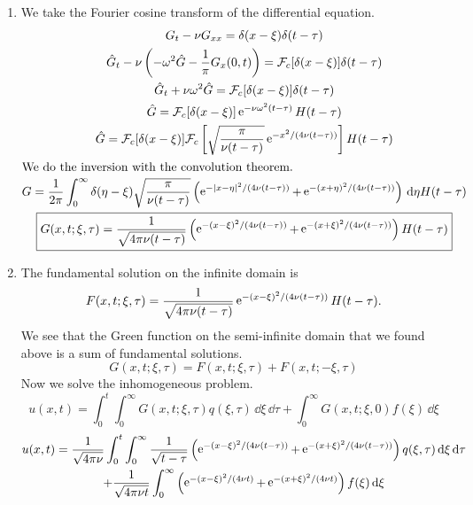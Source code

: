 {\begin{Solution}
  \begin{enumerate}
  \item
    We take the Fourier cosine transform of the differential equation.
    \begin{gather*}
      G_t - \nu G_{x x} = \delta(x-\xi) \delta(t-\tau)
      \\
      \hat{G}_t - \nu \left( - \omega^2 \hat{G} - \frac{1}{\pi} G_x(0,t) \right)
      = \mathcal{F}_c[\delta(x-\xi)] \delta(t-\tau)
      \\
      \hat{G}_t + \nu \omega^2 \hat{G} = \mathcal{F}_c[\delta(x-\xi)] \delta(t-\tau)
      \\
      \hat{G} = \mathcal{F}_c[\delta(x-\xi)] \mathop{\mathrm{e}}\nolimits^{-\nu \omega^2 (t-\tau)} H(t-\tau)
      \\
      \hat{G} = \mathcal{F}_c[\delta(x-\xi)] 
      \mathcal{F}_c \left[ \sqrt{ \frac{\pi}{\nu(t-\tau)} } \mathop{\mathrm{e}}\nolimits^{- x^2 / (4 \nu (t-\tau) )} 
      \right] H(t-\tau)
      \\
      \intertext{We do the inversion with the convolution theorem.}
      G = \frac{1}{2 \pi} \int_0^\infty \delta(\eta-\xi) \sqrt{ \frac{\pi}{\nu(t-\tau)} } 
      \left( \mathop{\mathrm{e}}\nolimits^{- |x-\eta|^2/ (4 \nu (t-\tau) )} + \mathop{\mathrm{e}}\nolimits^{- (x+\eta)^2/ (4 \nu (t-\tau) )} \right)
      \,\mathrm{d} \eta H(t-\tau)
      \\
      \boxed{
        G(x,t;\xi,\tau) = \frac{1}{ \sqrt{ 4 \pi \nu(t-\tau) } } 
        \left( \mathop{\mathrm{e}}\nolimits^{- (x-\xi)^2/ (4 \nu (t-\tau) )} + \mathop{\mathrm{e}}\nolimits^{- (x+\xi)^2/ (4 \nu (t-\tau) )} \right)
        H(t-\tau)
        }
    \end{gather*}
  \item
    The fundamental solution on the infinite domain is
    \[
    F(x,t;\xi,\tau) = \frac{1}{ \sqrt{ 4 \pi \nu (t-\tau) } } 
    \mathop{\mathrm{e}}\nolimits^{- (x-\xi)^2/ (4 \nu (t-\tau) )} H(t-\tau).
    \]
    We see that the Green function on the semi-infinite domain that we 
    found above is a sum of fundamental solutions.
    \[
    G(x,t;\xi,\tau) = F(x,t;\xi,\tau) + F(x,t;-\xi,\tau)
    \]
    Now we solve the inhomogeneous problem.
    \[
    u(x,t) = \int_0^t \int_0^\infty G(x,t;\xi,\tau) q(\xi,\tau) \,\dd \xi \,\dd \tau
    + \int_0^\infty G(x,t;\xi,0) f(\xi) \,\dd \xi
    \]
    \begin{multline*}
      u(x,t) = \frac{1}{ \sqrt{ 4 \pi \nu } } \int_0^t \int_0^\infty \frac{1}{\sqrt{t-\tau}}
      \left( \mathop{\mathrm{e}}\nolimits^{- (x-\xi)^2/ (4 \nu (t-\tau) )} + \mathop{\mathrm{e}}\nolimits^{- (x+\xi)^2/ (4 \nu (t-\tau) )} \right)
      q(\xi,\tau) \,\mathrm{d} \xi \,\mathrm{d} \tau
      \\
      + \frac{1}{ \sqrt{ 4 \pi \nu t } } \int_0^\infty 
      \left( \mathop{\mathrm{e}}\nolimits^{- (x-\xi)^2/ (4 \nu t)} + \mathop{\mathrm{e}}\nolimits^{- (x+\xi)^2/ (4 \nu t)} \right)
      f(\xi) \,\mathrm{d} \xi
    \end{multline*}
  \end{enumerate}
\end{Solution}












}
